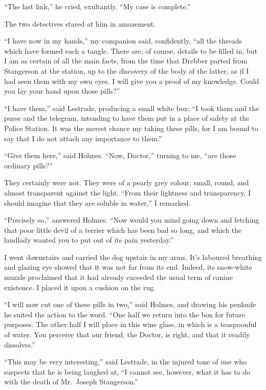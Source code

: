 \documentclass[12pt,english,oneside]{book}
\begin{document}
{}``The last link,'' he cried, exultantly. {}``My case is complete.''

The two detectives stared at him in amazement.

{}``I have now in my hands,'' my companion said, confidently, {}``all
the threads which have formed such a tangle. There are, of course,
details to be filled in, but I am as certain of all the main facts,
from the time that Drebber parted from Stangerson at the station,
up to the discovery of the body of the latter, as if I had seen them
with my own eyes. I will give you a proof of my knowledge. Could you
lay your hand upon those pills?''

{}``I have them,'' said Lestrade, producing a small white box; {}``I
took them and the purse and the telegram, intending to have them put
in a place of safety at the Police Station. It was the merest chance
my taking these pills, for I am bound to say that I do not attach
any importance to them.''

{}``Give them here,'' said Holmes. {}``Now, Doctor,'' turning
to me, {}``are those ordinary pills?''

They certainly were not. They were of a pearly grey colour, small,
round, and almost transparent against the light. {}``From their lightness
and transparency, I should imagine that they are soluble in water,''
I remarked.

{}``Precisely so,'' answered Holmes. {}``Now would you mind going
down and fetching that poor little devil of a terrier which has been
bad so long, and which the landlady wanted you to put out of its pain
yesterday.''

I went downstairs and carried the dog upstair in my arms. It's laboured
breathing and glazing eye showed that it was not far from its end.
Indeed, its snow-white muzzle proclaimed that it had already exceeded
the usual term of canine existence. I placed it upon a cushion on
the rug.

{}``I will now cut one of these pills in two,'' said Holmes, and
drawing his penknife he suited the action to the word. {}``One half
we return into the box for future purposes. The other half I will
place in this wine glass, in which is a teaspoonful of water. You
perceive that our friend, the Doctor, is right, and that it readily
dissolves.''

{}``This may be very interesting,'' said Lestrade, in the injured
tone of one who suspects that he is being laughed at, {}``I cannot
see, however, what it has to do with the death of Mr.\ Joseph Stangerson.''
\end{document}
